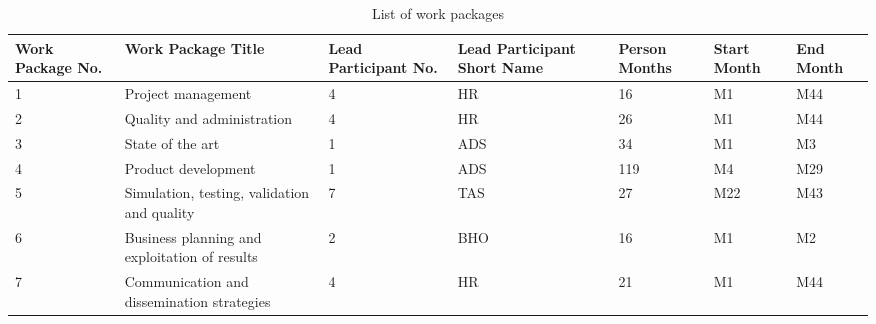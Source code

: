 \begin{table}[H]
	\centering
	\begin{tabular}{p{1.4cm} >{\raggedright\arraybackslash}p{2.7cm} p{1.8cm} p{2.2cm} p{1.3cm} p{1.2cm} p{1.3cm}}
	
		\toprule[2pt]
		
		\textbf{Work Package No.} & \textbf{Work Package Title} & \textbf{Lead Participant No.} & \textbf{Lead Participant Short Name} & \textbf{Person Months} & \textbf{Start Month} & \textbf{End Month} \\
		
		\midrule[1.5pt] 
		
		 1& Project management & 4 & HR & 16 & M1 & M44 \vspace{0.2cm} \\
		
		\midrule
	
		 2& Quality and administration & 4 & HR &  26 & M1 & M44 \vspace{0.2cm} \\
		
		\midrule
		
		 3& State of the art & 1 & ADS & 34 & M1 & M3 \vspace{0.2cm} \\
	
		\midrule
	
	 	 4& Product development & 1 & ADS & 119 & M4 & M29 \vspace{0.2cm} \\
	 	 
	 	 \midrule
	 	 
	 	 5& Simulation, testing, validation and quality & 7 & TAS & 27 & M22  & M43 \vspace{0.2cm} \\
	 	 
	 	 \midrule
	 	 
	 	 6& Business planning and exploitation of results & 2 & BHO & 16 & M1 & M2 \vspace{0.2cm} \\
	 	 
	 	 \midrule
	 	 
	 	 7& Communication and dissemination strategies & 4 & HR & 21 & M1 & M44 \vspace{0.2cm} \\
		
		\bottomrule[2pt]
	
	\end{tabular}
	\caption{List of work packages}
	\label{workpackages}
\end{table}

